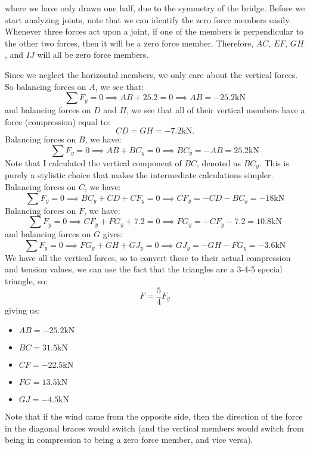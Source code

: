 \documentclass{article}
\begin{document}
where we have only drawn one half, due to the symmetry of the bridge. Before we start analyzing joints, note that we can identify the zero force members easily. Whenever three forces act upon a joint, if one of the members is perpendicular to the other two forces, then it will be a zero force member. Therefore, $AC$, $EF$, $GH$, and $IJ$ will all be zero force members.

Since we neglect the horizontal members, we only care about the vertical forces. So balancing forces on $A$, we see that:
\begin{equation}
    \sum F_y = 0 \implies AB+25.2 = 0 \implies AB=-25.2\si{\kilo\newton} 
    \label{eq:}
\end{equation}
and balancing forces on $D$ and $H$, we see that all of their vertical members have a force (compression) equal to:
\begin{equation}
    CD = GH = -7.2\si{\kilo\newton}.
    \label{eq:}
\end{equation}
Balancing forces on $B$, we have:
\begin{equation}
    \sum F_y = 0 \implies AB+BC_y=0 \implies BC_y = -AB = 25.2\si{\kilo\newton}
    \label{eq:}
\end{equation}
Note that I calculated the vertical component of $BC$, denoted as $BC_y$. This is purely a stylistic choice that makes the intermediate calculations simpler. Balancing forces on $C$, we have:
\begin{equation}
    \sum F_y= 0 \implies BC_y+CD+CF_y=0 \implies CF_y=-CD-BC_y=-18\si{\kilo\newton}
    \label{eq:}
\end{equation}
Balancing forces on $F$, we have:
\begin{equation}
    \sum F_y = 0 \implies CF_y+FG_y+7.2=0\implies FG_y=-CF_y-7.2=10.8\si{\kilo\newton}
    \label{eq:}
\end{equation}
and balancing forces on $G$ gives:
\begin{equation}
    \sum F_y = 0\implies FG_y+GH+GJ_y = 0 \implies GJ_y=-GH-FG_y=-3.6\si{\kilo\newton}
    \label{eq:}
\end{equation}
We have all the vertical forces, so to convert these to their actual compression and tension values, we can use the fact that the triangles are a 3-4-5 special triangle, so:
\begin{equation}
    F = \frac{5}{4}F_y
    \label{eq:}
\end{equation}
giving us:
\begin{itemize}
    \item $AB=-25.2\si{\kilo\newton}$
    \item $BC=31.5\si{\kilo\newton}$
    \item $CF=-22.5\si{\kilo\newton}$
    \item $FG=13.5\si{\kilo\newton}$
    \item $GJ=-4.5\si{\kilo\newton}$
\end{itemize}
Note that if the wind came from the opposite side, then the direction of the force in the diagonal braces would switch (and the vertical members would switch from being in compression to being a zero force member, and vice versa).
\end{document}
